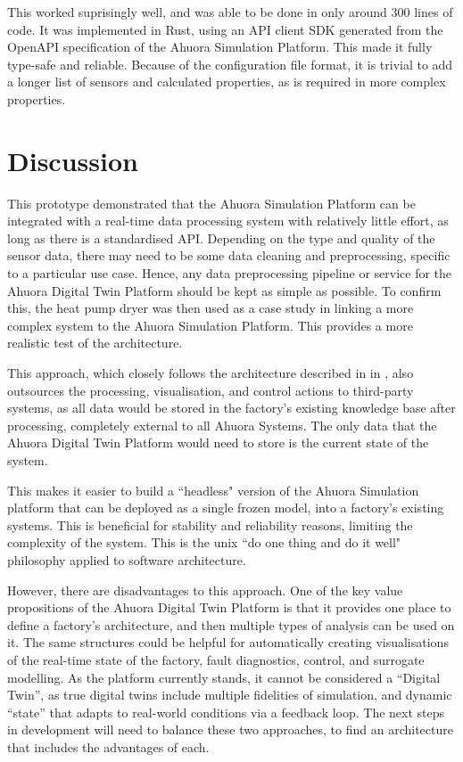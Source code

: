 This worked suprisingly well, and was able to be done in only around 300 lines of code. 
It was implemented in Rust, using an API client SDK generated from the OpenAPI specification of the Ahuora Simulation Platform. 
This made it fully type-safe and reliable. 
Because of the configuration file format, it is trivial to add a longer list of sensors and calculated properties, as is required in more complex properties.

\section{Discussion} \label{sec:prototypeinsights}

This prototype demonstrated that the Ahuora Simulation Platform can be integrated with a real-time data processing system with relatively little effort, as long as there is a standardised API. 
Depending on the type and quality of the sensor data, there may need to be some data cleaning and preprocessing, specific to a particular use case. 
Hence, any data preprocessing pipeline or service for the Ahuora Digital Twin Platform should be kept as simple as possible.
To confirm this, the heat pump dryer was then used as a case study in linking a more complex system to the Ahuora Simulation Platform. 
This provides a more realistic test of the architecture.

This approach, which closely follows the architecture described in  in , also outsources the processing, visualisation, and control actions to third-party systems, as all data would be stored in the factory's existing knowledge base after processing, completely external to all Ahuora Systems. The only data that the Ahuora Digital Twin Platform would need to store is the current state of the system. 

This makes it easier to build a ``headless" version of the Ahuora Simulation platform that can be deployed as a single frozen model, into a factory's existing systems. 
This is beneficial for stability and reliability reasons, limiting the complexity of the system. This is the unix ``do one thing and do it well" philosophy applied to software architecture.


However, there are disadvantages to this approach. 
One of the key value propositions of the Ahuora Digital Twin Platform is that it provides one place to define a factory's architecture, and then multiple types of analysis can be used on it. The same structures could be helpful for automatically creating visualisations of the real-time state of the factory, fault diagnostics, control, and surrogate modelling. 
As the platform currently stands, it cannot be considered a ``Digital Twin'', as true digital twins include multiple fidelities of simulation, and dynamic ``state'' that adapts to real-world conditions via a feedback loop. 
The next steps in development will need to balance these two approaches, to find an architecture that includes the advantages of each.
